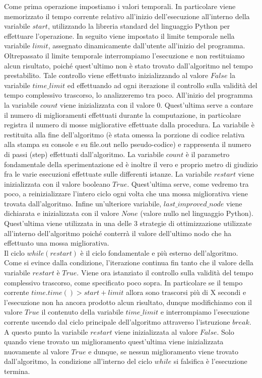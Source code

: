 Come prima operazione impostiamo i valori temporali. In particolare viene memorizzato il tempo corrente relativo all'inizio dell'esecuzione all'interno della variabile $start$, utilizzando la libreria standard del linguaggio Python per effettuare l'operazione. In seguito viene impostato il limite temporale nella variabile $limit$, assegnato dinamicamente dall'utente all'inizio del programma. Oltrepassato il limite temporale interrompiamo l'esecuzione e non restituiamo alcun risultato, poiché quest'ultimo non è stato trovato dall'algoritmo nel tempo prestabilito. Tale controllo viene effettuato inizializzando al valore $False$ la variabile $time\_limit$ ed effettuando ad ogni iterazione il controllo sulla validità del tempo complessivo trascorso, lo analizzeremo tra poco. All'inizio del programma la variabile $count$ viene inizializzata con il valore $0$. Quest'ultima serve a contare il numero di miglioramenti effettuati durante la computazione, in particolare registra il numero di mosse migliorative effettuate dalla procedura. La variabile è restituita alla fine dell'algoritmo (è stata omessa la porzione di codice relativa alla stampa su console e su file.out nello pseudo-codice) e rappresenta il numero di passi (step) effettuati dall'algoritmo. La variabile $count$ è il parametro fondamentale della sperimentazione ed è inoltre il vero e proprio metro di giudizio fra le varie esecuzioni effettuate sulle differenti istanze. La variabile $restart$ viene inizializzata con il valore booleano $True$. Quest'ultima serve, come vedremo tra poco, a reinizializzare l'intero ciclo ogni volta che una mossa migliorativa viene trovata dall'algoritmo. Infine un'ulteriore variabile, $last\_improved\_node$ viene dichiarata e inizializzata con il valore $None$ (valore nullo nel linguaggio Python). Quest'ultima viene utilizzata in una delle 3 strategie di ottimizzazione utilizzate all'interno dell'algoritmo poiché conterrà il valore dell'ultimo nodo che ha effettuato una mossa migliorativa.\\
Il ciclo $while(restart)$ è il ciclo fondamentale e più esterno dell'algoritmo. Come si evince dalla condizione, l'iterazione continua fin tanto che il valore della variabile $restart$ è $True$. Viene ora istanziato il controllo sulla validità del tempo complessivo trascorso, come specificato poco sopra. In particolare se il tempo corrente $time.time() > start + limit$ allora sono trascorsi più di X secondi e l'esecuzione non ha ancora prodotto alcun risultato, dunque modifichiamo con il valore $True$ il contenuto della variabile $time\_limit$ e interrompiamo l'esecuzione corrente uscendo dal ciclo principale dell'algoritmo attraverso l'istruzione $break$. A questo punto la variabile $restart$ viene inizializzata al valore $False$. Solo quando viene trovato un miglioramento quest'ultima viene inizializzata nuovamente al valore $True$ e dunque, se nessun miglioramento viene trovato dall'algoritmo, la condizione all'interno del ciclo $while$ si falsifica è l'esecuzione termina.\\
